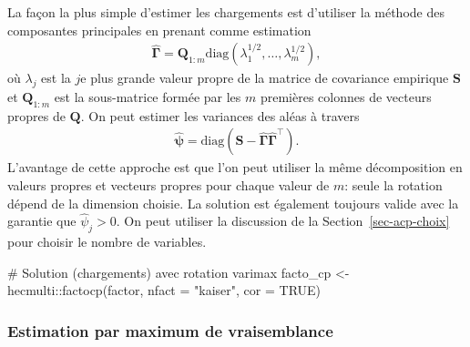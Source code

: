 \documentclass[
  11pt,
  letterpaper,
]{book}
\newenvironment{Shaded}{\begin{snugshade}}{\end{snugshade}}
\newcommand{\AttributeTok}[1]{\textcolor[rgb]{0.40,0.45,0.13}{#1}}
\newcommand{\CommentTok}[1]{\textcolor[rgb]{0.37,0.37,0.37}{#1}}
\newcommand{\ConstantTok}[1]{\textcolor[rgb]{0.56,0.35,0.01}{#1}}
\newcommand{\FunctionTok}[1]{\textcolor[rgb]{0.28,0.35,0.67}{#1}}
\newcommand{\NormalTok}[1]{\textcolor[rgb]{0.00,0.23,0.31}{#1}}
\newcommand{\OtherTok}[1]{\textcolor[rgb]{0.00,0.23,0.31}{#1}}
\newcommand{\SpecialCharTok}[1]{\textcolor[rgb]{0.37,0.37,0.37}{#1}}
\newcommand{\StringTok}[1]{\textcolor[rgb]{0.13,0.47,0.30}{#1}}
\theoremstyle{definition}
\theoremstyle{remark}
\begin{document}
La façon la plus simple d'estimer les chargements est d'utiliser la
méthode des composantes principales en prenant comme estimation
\begin{align*}
\widehat{\boldsymbol{\Gamma}} = \boldsymbol{Q}_{1:m} \mathrm{diag}(\lambda_1^{1/2}, \ldots, \lambda_m^{1/2}),
\end{align*} où \(\lambda_j\) est la \(j\)e plus grande valeur propre de
la matrice de covariance empirique \(\mathbf{S}\) et
\(\boldsymbol{Q}_{1:m}\) est la sous-matrice formée par les \(m\)
premières colonnes de vecteurs propres de \(\boldsymbol{Q}\). On peut
estimer les variances des aléas à travers \begin{align*}
\widehat{\boldsymbol{\psi}} = \mathrm{diag}\left(\mathbf{S} - \widehat{\boldsymbol{\Gamma}}\widehat{\boldsymbol{\Gamma}}^\top\right).
\end{align*} L'avantage de cette approche est que l'on peut utiliser la
même décomposition en valeurs propres et vecteurs propres pour chaque
valeur de \(m\): seule la rotation dépend de la dimension choisie. La
solution est également toujours valide avec la garantie que
\(\widehat{\psi}_j>0\). On peut utiliser la discussion de la
Section~\ref{sec-acp-choix} pour choisir le nombre de variables.

\begin{Shaded}
\begin{Highlighting}[]
\CommentTok{\# Solution (chargements) avec rotation varimax}
\NormalTok{facto\_cp }\OtherTok{\textless{}{-}}\NormalTok{ hecmulti}\SpecialCharTok{::}\FunctionTok{factocp}\NormalTok{(factor, }\AttributeTok{nfact =} \StringTok{"kaiser"}\NormalTok{, }\AttributeTok{cor =} \ConstantTok{TRUE}\NormalTok{)}
\end{Highlighting}
\end{Shaded}

\hypertarget{estimation-par-maximum-de-vraisemblance}{%
\subsubsection{Estimation par maximum de
vraisemblance}\label{estimation-par-maximum-de-vraisemblance}}
\end{document}
